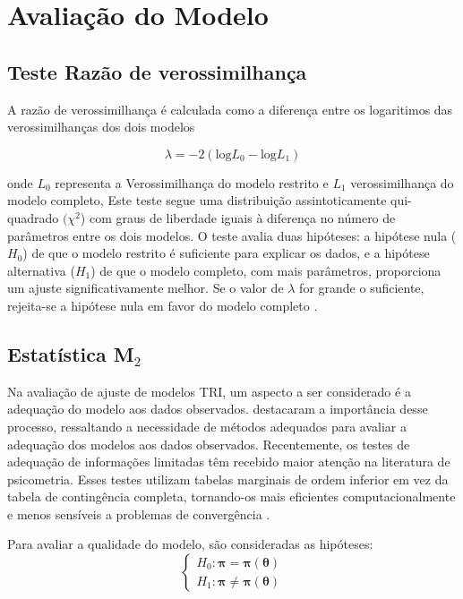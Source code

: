 \section{Avaliação do Modelo}

\subsection{Teste Razão de verossimilhança}

 A razão de verossimilhança é calculada como a diferença entre os logaritimos das verossimilhanças dos dois modelos

\[
\lambda = -2 (\text{log} L_0 - \text{log} L_1)
\]

onde $L_0$ representa a Verossimilhança do modelo restrito e
$L_1$ verossimilhança do modelo completo, Este teste segue uma distribuição assintoticamente qui-quadrado $(\chi^2$) com graus de liberdade iguais à diferença no número de parâmetros entre os dois modelos. O teste avalia duas hipóteses: a hipótese nula ($H_0$) de que o modelo restrito é suficiente para explicar os dados, e a hipótese alternativa ($H_1$) de que o modelo completo, com mais parâmetros, proporciona um ajuste significativamente melhor. Se o valor de $\lambda$ for grande o suficiente, rejeita-se a hipótese nula em favor do modelo completo \cite{casella2010inferencia}. 

\subsection{Estatística M$_2$}

Na avaliação de ajuste de modelos TRI, um aspecto a ser considerado é a adequação do modelo aos dados observados.  destacaram a importância desse processo, ressaltando a necessidade de métodos adequados para avaliar a adequação dos modelos aos dados observados. Recentemente, os testes de adequação de informações limitadas têm recebido maior atenção na literatura de psicometria. Esses testes utilizam tabelas marginais de ordem inferior em vez da tabela de contingência completa, tornando-os mais eficientes computacionalmente e menos sensíveis a problemas de convergência \cite{maydeu2014assessing}.

Para avaliar a qualidade do modelo, são consideradas as hipóteses:
\[
\begin{cases}
	H_0: \boldsymbol{\pi} = \boldsymbol{\pi}(\boldsymbol{\theta}) \\
	
	H_1: \boldsymbol{\pi} \neq \boldsymbol{\pi}(\boldsymbol{\theta})
\end{cases}
\]

